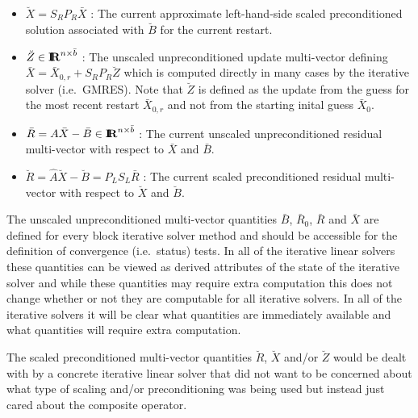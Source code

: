 \documentclass[pdf,ps2pdf,11pt]{SANDreport}
\begin{document}
\begin{itemize}
{}\item $\breve{X} = S_R P_R \bar{X}$ : The current approximate
left-hand-side scaled preconditioned solution associated with
$\breve{B}$ for the current restart.

{}\item $\breve{Z}\in\mbox{\textbf{I}}\hspace{-0.6ex}\mbox{\textbf{R}}^{n {}\times {}\bar{b}}$ : The unscaled
unpreconditioned update multi-vector defining $\bar{X} = \bar{X}_{0,r}
+ S_R P_R {}\breve{Z}$ which is computed directly in many cases by the
iterative solver (i.e.~GMRES).  Note that $\breve{Z}$ is defined as
the update from the guess for the most recent restart $\bar{X}_{0,r}$
and not from the starting inital guess $\bar{X}_0$.

{}\item $\bar{R} = A \bar{X} - \bar{B} {}\in\mbox{\textbf{I}}\hspace{-0.6ex}\mbox{\textbf{R}}^{n {}\times
{}\bar{b}}$ : The current unscaled unpreconditioned residual
multi-vector with respect to $\bar{X}$ and $\bar{B}$.

{}\item $\breve{R} = \hat{A} \breve{X} - \breve{B} = P_L S_L \bar{R}$
: The current scaled preconditioned residual multi-vector with respect
to $\breve{X}$ and $\breve{B}$.

\end{itemize}

The unscaled unpreconditioned multi-vector quantities $\bar{B}$,
$\bar{R}_0$, $\bar{R}$ and $\bar{X}$ are defined for every block
iterative solver method and should be accessible for the definition of
convergence (i.e.~status) tests.  In all of the iterative linear
solvers these quantities can be viewed as derived attributes of the
state of the iterative solver and while these quantities may require
extra computation this does not change whether or not they are
computable for all iterative solvers.  In all of the iterative solvers
it will be clear what quantities are immediately available and what
quantities will require extra computation.

The scaled preconditioned multi-vector quantities $\breve{R}$,
$\breve{X}$ and/or $\breve{Z}$ would be dealt with by a concrete
iterative linear solver that did not want to be concerned about what
type of scaling and/or preconditioning was being used but instead just
cared about the composite operator.
\end{document}
